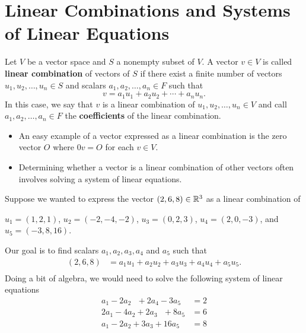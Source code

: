 \section{Linear Combinations and Systems of Linear Equations}
\begin{definition}
   Let \( V  \) be a vector space and \( S  \) a nonempty subset of \( V  \). A vector \( v \in V  \) is called \textbf{linear combination} of vectors of \( S  \) if there exist a finite number of vectors \( u_{1} , u_{2}, \dots, u_{n} \in S  \) and scalars \( a_{1}, a_{2} , \dots, a_{n} \in F  \) such that 
   \[  v = a_{1} u_{1} + a_{2} u_{2} + \cdots + a_{n} u_{n}. \] In this case, we say that \( v \) is a linear combination of \( u_{1} , u_{2} , \dots, u_{n} \in V   \) and call \( a_{1} , a_{2} , \dots, a_{n} \in F   \) the \textbf{coefficients} of the linear combination. 
\end{definition}

\begin{itemize}
    \item An easy example of a vector expressed as a linear combination is the zero vector \( O  \) where \( 0 v = O  \) for each \( v \in V  \).
    \item Determining whether a vector is a linear combination of other vectors often involves solving a system of linear equations.
\end{itemize}

\begin{eg}
    Suppose we wanted to express the vector \( (2,6,8) \in \mathbb{R}^{3}  \) as a linear combination of 
    \begin{center}
    \( u_{1} = (1,2,1)  \), \( u_{2} = (-2, -4, -2) \), \( u_{3} = (0,2,3) \), \( u_{4} = (2,0,-3) \), and \( u_{5} = (-3, 8, 16) \).
    \end{center}
    Our goal is to find scalars \( a_{1}, a_{2}, a_{3}, a_{4} \) and \( a_{5}  \) such that 
    \begin{align*}
        (2,6,8) &= a_{1} u_{1} + a_{2} u_{2} + a_{3} u_{3} + a_{4} u_{4} + a_{5}  u_{5}.   \\
    \end{align*}
    Doing a bit of algebra, we would need to solve the following system of linear equations 
    \begin{align*}
        a_{1} - 2a_{2}  \ \ \  + 2a_{4} - 3a_{5} &= 2  \\
        2a_{1} - 4a_{2} + 2a_{3}  \ \ \  + 8a_{5} &= 6  \\
        a_{1} - 2a_{2} + 3a_{3} + 16a_{5} &= 8
    \end{align*}
\end{eg}

